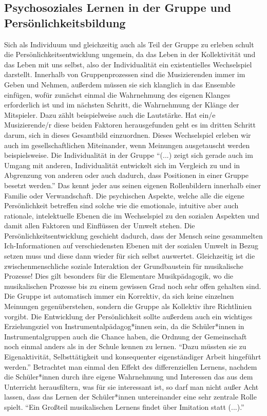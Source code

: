 \subsection{Psychosoziales Lernen in der Gruppe und Persönlichkeitsbildung}
Sich als Individuum und gleichzeitig auch als Teil der Gruppe zu erleben schult
die Persönlichkeitsentwicklung ungemein, da das Leben in der Kollektivität und
das Leben mit uns selbst, also der Individualität ein existentielles
Wechselspiel darstellt. Innerhalb von Gruppenprozessen sind die Musizierenden
immer im Geben und Nehmen, außerdem müssen sie sich klanglich in das Ensemble
einfügen, wofür zunächst einmal die Wahrnehmung des eigenen Klanges erforderlich
ist und im nächsten Schritt, die Wahrnehmung der Klänge der Mitspieler. Dazu
zählt beispielweise auch die Lautstärke. Hat ein/e Musizierende/r diese beiden
Faktoren herausgefunden geht es im dritten Schritt darum, sich in dieses
Gesamtbild einzuordnen. Dieses Wechselspiel erleben wir auch im
gesellschaftlichen Miteinander, wenn Meinungen ausgetauscht werden
beispielsweise. Die Individualität in der Gruppe \enquote{(...) zeigt sich
gerade auch im Umgang mit anderen, Individualität entwickelt sich im Vergleich
zu und in Abgrenzung von anderen oder auch dadurch, dass Positionen in einer
Gruppe besetzt werden.}\autocite[95]{ribke:emp} Das kennt jeder aus seinen
eigenen Rollenbildern innerhalb einer Familie oder Verwandschaft. Die
psychischen Aspekte, welche alle die eigene Persönlichkeit betreffen sind solche
wie die emotionale, intuitive aber auch rationale, intelektuelle Ebenen die im
Wechselspiel zu den sozialen Aspekten und damit allen Faktoren und Einflüssen
der Umwelt stehen. Die Persönlichkeitsentwicklung geschieht dadurch, dass der
Mensch seine gesammelten Ich-Informationen auf verschiedensten Ebenen mit der
sozialen Umwelt in Bezug setzen muss und diese dann wieder für sich selbst
auswertet. Gleichzeitig ist die zwischenmenschliche soziale Interaktion der
Grundbaustein für musikalische Prozesse! Dies gilt besonders für die Elementare
Musikpädagogik, wo die musikalischen Prozesse bis zu einem gewissen Grad noch
sehr offen gehalten sind. Die Gruppe ist automatisch immer ein Korrektiv, da
sich keine einzelnen Meinungen gegenüberstehen, sondern die Gruppe als Kollektiv
ihre Richtlinien vorgibt. Die Entwicklung der Persönlichkeit sollte außerdem
auch ein wichtiges Erziehungsziel von Instrumentalpädagog*innen sein, da die
Schüler*innen in Instrumentalgruppen auch die Chance haben, die Ordnung der
Gemeinschaft noch einmal anders als in der Schule kennen zu lernen.
\enquote{Dazu müssten sie zu Eigenaktivität, Selbsttätigkeit und konsequenter
eigenständiger Arbeit hingeführt
werden.}\autocite[64]{losert:die_kunst_zu_unterrichten} Betrachtet man einmal
den Effekt des differenziellen Lernens, nachdem die Schüler*innen durch ihre
eigene Wahrnehmung und Interessen das aus dem Unterricht herausfiltern, was für
sie interessant ist, so darf man nicht außer Acht lassen, dass das Lernen der
Schüler*innen untereinander eine sehr zentrale Rolle spielt. \enquote{Ein
Großteil musikalischen Lernens findet über Imitation statt
(...).}\autocite[98]{doerne:umfassend_musizieren}

